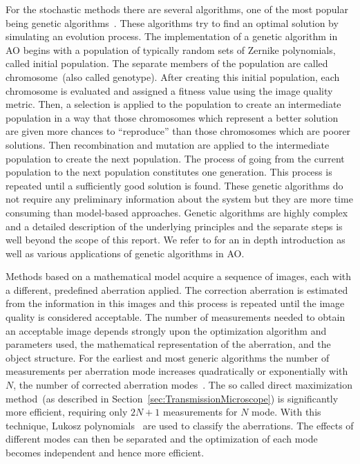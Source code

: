 For the stochastic methods there are several algorithms, one of the most popular being genetic algorithms~\cite{Genetic_tutorial}. These algorithms try to find an optimal solution by simulating an evolution process. The implementation of a genetic algorithm in AO begins with a population of typically random sets of Zernike polynomials, called initial population. The separate members of the population are called chromosome~(also called genotype). After creating this initial population, each chromosome is evaluated and assigned a fitness value using the image quality metric. Then, a selection is applied to the population to create an intermediate population in a way that those chromosomes which represent a better solution are given more chances to ``reproduce'' than those chromosomes which are poorer solutions. Then recombination and mutation are applied to the intermediate population to create the next population. The process of going from the current population to the next population constitutes one generation. This process is repeated until a sufficiently good solution is found. These genetic algorithms do not require any preliminary information about the system but they are more time consuming than model-based approaches. Genetic algorithms are highly complex and a detailed description of the underlying principles and the separate steps is well beyond the scope of this report. We refer to \cite{Genetic_tutorial,Genetic_Algor1,Genetic_Algor2,Genetic_Algor3}for an in depth introduction as well as various applications of genetic algorithms in AO.

Methods based on a mathematical model acquire a sequence of images, each with a different, predefined aberration applied. The correction aberration is estimated from the information in this images and this process is repeated until the image quality is considered acceptable. The number of measurements needed to obtain an acceptable image depends strongly upon the optimization algorithm and parameters used, the mathematical representation of the aberration, and the object structure. For the earliest and most generic algorithms the number of measurements per aberration mode increases quadratically or exponentially with $N$, the number of corrected aberration modes~\cite{wide_sphere_packing}. The so called direct maximization method~(as described in Section~\ref{sec:TransmissionMicroscope}) is significantly more efficient, requiring only $2N+1$ measurements for $N$ mode. With this technique, Lukosz polynomials~\cite{wide_Lukosz_Modes} are used to classify the aberrations. The effects of different modes can then be separated and the optimization of each mode becomes independent and hence more efficient.

